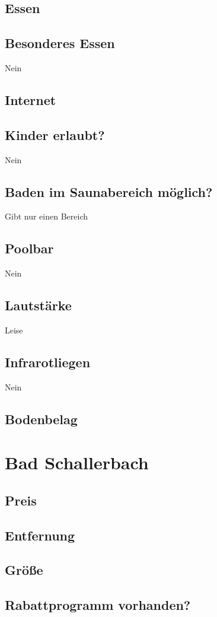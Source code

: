 \documentclass{article}
\begin{document}
\subsection*{Essen}
\subsection*{Besonderes Essen} Nein
\subsection*{Internet}
\subsection*{Kinder erlaubt?} Nein
\subsection*{Baden im Saunabereich möglich?} Gibt nur einen Bereich
\subsection*{Poolbar} Nein
\subsection*{Lautstärke} Leise
\subsection*{Infrarotliegen} Nein
\subsection*{Bodenbelag}
\pagebreak

\section*{Bad Schallerbach}
\subsection*{Preis}
\subsection*{Entfernung}
\subsection*{Größe}
\subsection*{Rabattprogramm vorhanden?}
\end{document}
